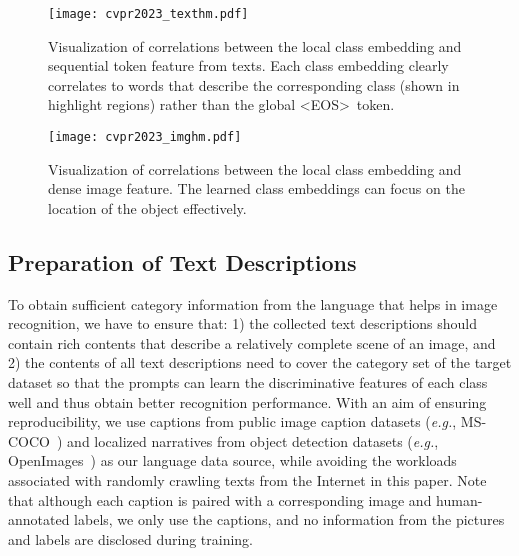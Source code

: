 \documentclass[10pt,twocolumn,letterpaper]{article}
\begin{document}
\begin{figure*}
  \centering
\texttt{[image: cvpr2023\_texthm.pdf]}

  \caption{Visualization of correlations between the local class embedding  and sequential token feature from texts. 
Each class embedding clearly correlates to words that describe the corresponding class (shown in highlight regions) rather than the global \textless EOS\textgreater~token.
}
  \label{fig:texthm}
\end{figure*}

\begin{figure}
  \centering
\texttt{[image: cvpr2023\_imghm.pdf]}

  \caption{Visualization of correlations between the local class embedding  and dense image feature. The learned class embeddings can focus on the location of the object effectively.} \vskip -0.18in
  \label{fig:imghm}
\end{figure}

\subsection{Preparation of Text Descriptions}
\label{methods1}
To obtain sufficient category information from the language that helps in image recognition, we have to ensure that: 1) the collected text descriptions should contain rich contents that describe a relatively complete scene of an image, and 2) the contents of all text descriptions need to cover the category set of the target dataset so that the prompts can learn the discriminative features of each class well and thus obtain better recognition performance.
With an aim of ensuring reproducibility, we use captions from public image caption datasets (\emph{e.g.}, MS-COCO~\cite{coco}) and localized narratives from object detection datasets (\emph{e.g.}, OpenImages~\cite{openimages}) as our language data source, while avoiding the workloads associated with randomly crawling texts from the Internet in this paper. Note that although each caption is paired with a corresponding image and human-annotated labels, we only use the captions, and no information from the pictures and labels are disclosed during training.
\end{document}
